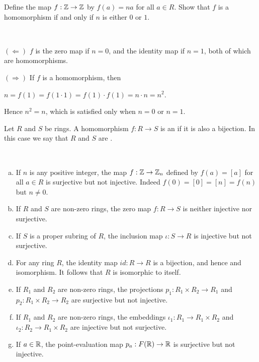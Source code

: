 \documentclass[11pt,fleqn,dvipsnames,usenames]{article}
\begin{document}
%
\begin{example}
Define the map $f:\mathbb{Z}\to\mathbb{Z}$ by $f(a) = na$ for all $a\in R$.  Show that $f$ is a homomorphism if and only if $n$ is either $0$ or $1$.
\end{example}
%
\begin{solution}~

$(\Leftarrow)$ $f$ is the zero map if $n = 0$, and the identity map if $n=1$, both of which are homomorphisms.
\vsp

$(\Rightarrow)$ If $f$ is a homomorphism, then
\begin{center}
$n = f(1) = f(1\cdot 1) = f(1)\cdot f(1) = n\cdot n = n^2$.
\end{center}
Hence $n^2 = n$, which is satisfied only when $n = 0$ or $n=1$.
\end{solution}
%
\begin{definition}
Let $R$ and $S$ be rings.  A homomorphism $f:R\to S$ is an  if it is also a bijection.  In this case we say that $R$ and $S$ are .
\end{definition}
%
\begin{examples}~
\begin{enumerate}[(a)]
\item If $n$ is any positive integer, the map $f:\mathbb{Z}\to\mathbb{Z}_{n}$ defined by $f(a) = [a]$ for all $a\in R$ is surjective but not injective.  Indeed $f(0) = [0] = [n] = f(n)$ but $n\neq 0$.
\item If $R$ and $S$ are non-zero rings, the zero map $f:R\to S$ is neither injective nor surjective.
\item If $S$ is a proper subring of $R$, the inclusion map $\iota:S\to R$ is injective but not surjective.
\item For any ring $R$, the identity map $id:R\to R$ is a bijection, and hence and isomorphism.  It follows that $R$ is isomorphic to itself.
\item If $R_{1}$ and $R_{2}$ are non-zero rings, the projections $p_{1}:R_{1}\times R_{2}\to R_{1}$ and $p_{2}:R_{1}\times R_{2}\to R_{2}$ are surjective but not injective.
\item If $R_{1}$ and $R_{2}$ are non-zero rings, the embeddings $\iota_1:R_1\to R_{1}\times R_{2}$ and $\iota_2:R_2\to R_{1}\times R_{2}$ are injective but not surjective.
\item If $a\in \mathbb{R}$, the point-evaluation map $p_{a}:F(\mathbb{R})\to \mathbb{R}$ is surjective but not injective.
\end{enumerate}
\end{examples}
\end{document}
